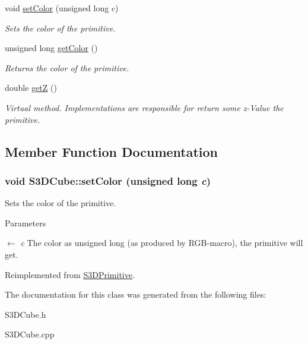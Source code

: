 \begin{DoxyCompactItemize}
\item 
void \hyperlink{class_s3_d_cube_a9c48875a16cc0ace3a3092e98663b785}{setColor} (unsigned long c)
\begin{DoxyCompactList}\small\item\em Sets the color of the primitive. \item\end{DoxyCompactList}\item 
\hypertarget{class_s3_d_cube_ab856b6fa4c1b72be7d2d7b79e26f3c38}{
unsigned long \hyperlink{class_s3_d_cube_ab856b6fa4c1b72be7d2d7b79e26f3c38}{getColor} ()}
\label{class_s3_d_cube_ab856b6fa4c1b72be7d2d7b79e26f3c38}

\begin{DoxyCompactList}\small\item\em Returns the color of the primitive. \item\end{DoxyCompactList}\item 
\hypertarget{class_s3_d_cube_a4ac1d080b330d6b69d24097f746ddd4c}{
double \hyperlink{class_s3_d_cube_a4ac1d080b330d6b69d24097f746ddd4c}{getZ} ()}
\label{class_s3_d_cube_a4ac1d080b330d6b69d24097f746ddd4c}

\begin{DoxyCompactList}\small\item\em Virtual method. Implementations are responsible for return some z-\/Value the primitive. \item\end{DoxyCompactList}\end{DoxyCompactItemize}


\subsection{Member Function Documentation}
\hypertarget{class_s3_d_cube_a9c48875a16cc0ace3a3092e98663b785}{
\subsubsection[{setColor}]{\setlength{\rightskip}{0pt plus 5cm}void S3DCube::setColor (unsigned long {\em c})}}
\label{class_s3_d_cube_a9c48875a16cc0ace3a3092e98663b785}


Sets the color of the primitive. 


\begin{DoxyParams}{Parameters}
\item[\mbox{$\leftarrow$} {\em c}]The color as unsigned long (as produced by RGB-\/macro), the primitive will get. \end{DoxyParams}


Reimplemented from \hyperlink{class_s3_d_primitive_a1c8f036193987522bdfb6a49b9b74000}{S3DPrimitive}.



The documentation for this class was generated from the following files:\begin{DoxyCompactItemize}
\item 
S3DCube.h\item 
S3DCube.cpp\end{DoxyCompactItemize}
